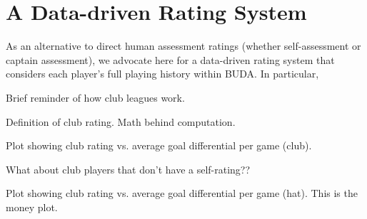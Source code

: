 \section{A Data-driven Rating System}\label{sec:club_rating}

As an alternative to direct human assessment ratings (whether self-assessment or captain assessment), we advocate here for a data-driven rating system that considers each player's full playing history within BUDA. In particular, 

Brief reminder of how club leagues work.

Definition of club rating.  Math behind computation.

Plot showing club rating vs. average goal differential per game (club).

What about club players that don't have a self-rating??

Plot showing club rating vs. average goal differential per game (hat).  This is the money plot.